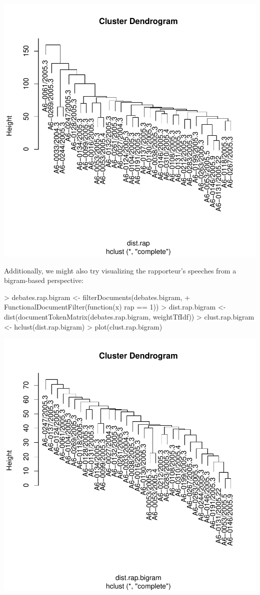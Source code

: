 \documentclass[11pt]{article}
\begin{document}
\includegraphics{intro-022}

Additionally, we might also try visualizing the rapporteur's speeches
from a bigram-based perspective:
\begin{Schunk}
\begin{Sinput}
> debates.rap.bigram <- filterDocuments(debates.bigram,
+   FunctionalDocumentFilter(function(x) rap == 1))
> dist.rap.bigram <- dist(documentTokenMatrix(debates.rap.bigram, weightTfIdf))
> clust.rap.bigram <- hclust(dist.rap.bigram)
> plot(clust.rap.bigram)
\end{Sinput}
\end{Schunk}
\includegraphics{intro-023}
\end{document}
